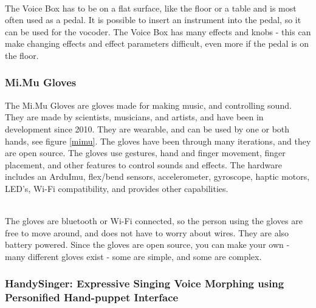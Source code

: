 \begin{minipage}{\linewidth}%
\label{voice_box}
\end{minipage}\\

The Voice Box has to be on a flat surface, like the floor or a table and is most often used as a pedal. It is possible to insert an instrument into the pedal, so it can be used for the vocoder. The Voice Box has many effects and knobs - this can make changing effects and effect parameters difficult, even more if the pedal is on the floor.

\subsubsection{Mi.Mu Gloves}

The Mi.Mu Gloves are gloves made for making music, and controlling sound\citep{Mimu}. They are made by scientists, musicians, and artists, and have been in development since 2010. They are wearable, and can be used by one or both hands, see figure \ref{mimu}. The gloves have been through many iterations, and they are open source. The gloves use gestures, hand and finger movement, finger placement, and other features to control sounds and effects. The hardware includes an ArduImu, flex/bend sensors, accelerometer, gyroscope, haptic motors, LED's, Wi-Fi compatibility, and provides other capabilities.\\

\begin{minipage}{\linewidth}%
\label{mimu}
\end{minipage}\\

The gloves are bluetooth or Wi-Fi connected, so the person using the gloves are free to move around, and does not have to worry about wires. They are also battery powered. 
Since the gloves are open source, you can make your own - many different gloves exist - some are simple, and some are complex.

\subsubsection{HandySinger: Expressive Singing Voice Morphing using Personified Hand-puppet Interface}

